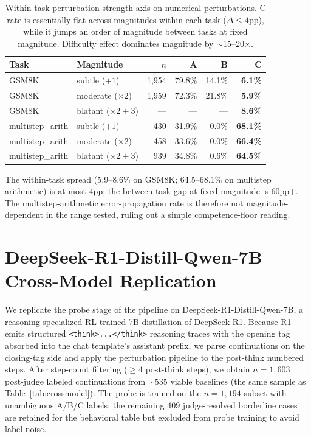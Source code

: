 \documentclass[10pt]{article} %
\begin{document}
\begin{table}[ht]
\caption{Within-task perturbation-strength axis on numerical perturbations. C rate is essentially flat across magnitudes within each task ($\Delta \leq 4$pp), while it jumps an order of magnitude between tasks at fixed magnitude. Difficulty effect dominates magnitude by $\sim$15--20$\times$.}
\label{tab:strength_axis_app}
\begin{center}
\scriptsize
\begin{tabular}{llrrrr}
\toprule
\textbf{Task} & \textbf{Magnitude} & \textbf{$n$} & \textbf{A} & \textbf{B} & \textbf{C} \\
\midrule
GSM8K            & subtle ($+1$)               & 1{,}954 & 79.8\% & 14.1\% & \textbf{6.1\%} \\
GSM8K            & moderate ($\times 2$)       & 1{,}959 & 72.3\% & 21.8\% & \textbf{5.9\%} \\
GSM8K            & blatant ($\times 2{+}3$)    & ---    & ---    & ---    & \textbf{8.6\%} \\
\midrule
multistep\_arith & subtle ($+1$)               & 430    & 31.9\% & 0.0\%  & \textbf{68.1\%} \\
multistep\_arith & moderate ($\times 2$)       & 458    & 33.6\% & 0.0\%  & \textbf{66.4\%} \\
multistep\_arith & blatant ($\times 2{+}3$)    & 939    & 34.8\% & 0.6\%  & \textbf{64.5\%} \\
\bottomrule
\end{tabular}
\end{center}
\end{table}

The within-task spread (5.9--8.6\% on GSM8K; 64.5--68.1\% on multistep arithmetic) is at most 4pp; the between-task gap at fixed magnitude is 60pp+. The multistep-arithmetic error-propagation rate is therefore not magnitude-dependent in the range tested, ruling out a simple competence-floor reading.


\section{DeepSeek-R1-Distill-Qwen-7B Cross-Model Replication}
\label{app:deepseek}

We replicate the probe stage of the pipeline on DeepSeek-R1-Distill-Qwen-7B, a reasoning-specialized RL-trained 7B distillation of DeepSeek-R1. Because R1 emits structured \texttt{<think>...</think>} reasoning traces with the opening tag absorbed into the chat template's assistant prefix, we parse continuations on the closing-tag side and apply the perturbation pipeline to the post-think numbered steps. After step-count filtering ($\geq 4$ post-think steps), we obtain $n = 1{,}603$ post-judge labeled continuations from $\sim 535$ viable baselines (the same sample as Table~\ref{tab:crossmodel}). The probe is trained on the $n = 1{,}194$ subset with unambiguous A/B/C labels; the remaining $409$ judge-resolved borderline cases are retained for the behavioral table but excluded from probe training to avoid label noise.
\end{document}
